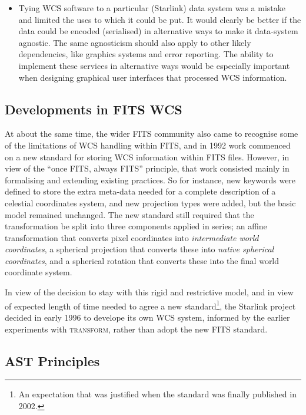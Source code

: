 \documentclass[final,authoryear,5p,times,twocolumn]{elsarticle}
\begin{document}
\begin{itemize}
\item Tying WCS software to a particular (Starlink) data system was a
  mistake and limited the uses to which it could be put. It would
  clearly be better if the data could be encoded (serialised) in
  alternative ways to make it data-system agnostic. The same
  agnosticism should also apply to other likely dependencies, like
  graphics systems and error reporting.  The ability to implement
  these services in alternative ways would be especially important
  when designing graphical user interfaces that processed WCS
  information.

\end{itemize}

\subsection{Developments in FITS WCS}

At about the same time, the wider FITS community also came to recognise
some of the limitations of WCS handling within FITS, and in 1992 work commenced
on a new standard for storing WCS information within FITS files. However,
in view of the ``once FITS, always FITS'' principle, that work consisted
mainly in formalising and extending existing practices. So for instance, new
keywords were defined to store the extra meta-data needed for a complete
description of a celestial coordinates system, and new projection types were
added, but the basic model remained unchanged. The new standard still required
that the transformation be split into three components applied in series; an
affine transformation that converts pixel coordinates into \emph{intermediate
world coordinates}, a spherical projection that converts these into \emph{native
spherical coordinates}, and a spherical rotation that converts these into the
final world coordinate system.

In view of the decision to stay with this rigid and restrictive model,
and in view of expected length of time needed to agree a new standard\footnote{An
expectation that was justified when the standard was finally published in 2002.},
the Starlink project decided in early 1996 to develope its own WCS system, informed
by the earlier experiments with \textsc{transform}, rather than adopt the new FITS
standard.

\subsection{AST Principles}
\end{document}
